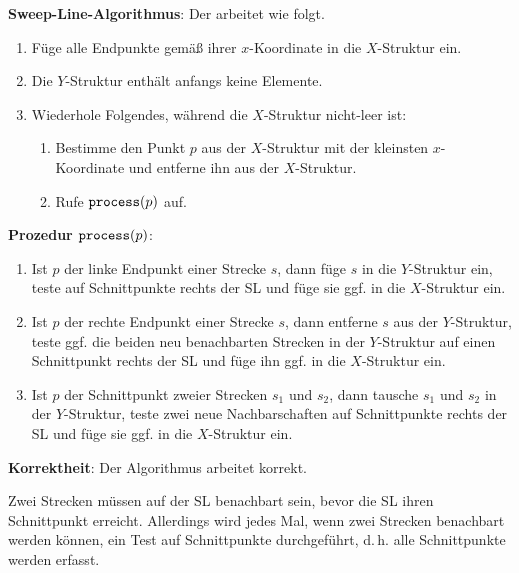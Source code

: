 \textbf{Sweep-Line-Algorithmus}:
Der  arbeitet wie folgt.
\begin{enumerate}
    \item
    Füge alle Endpunkte gemäß ihrer $x$-Koordinate in die $X$-Struktur ein.
    
    \item
    Die $Y$-Struktur enthält anfangs keine Elemente.
    
    \item
    Wiederhole Folgendes, während die $X$-Struktur nicht-leer ist:
    \begin{enumerate}
        \item
        Bestimme den Punkt $p$ aus der $X$-Struktur mit der kleinsten $x$-Koordinate und
        entferne ihn aus der $X$-Struktur.
        
        \item
        Rufe $\texttt{process}(p)$ auf.
    \end{enumerate}
\end{enumerate}

\linie
\pagebreak

\textbf{Prozedur $\texttt{process}(p)$}:
\begin{enumerate}
    \item
    Ist $p$ der linke Endpunkt einer Strecke $s$, dann füge $s$ in die $Y$-Struktur ein,
    teste auf Schnittpunkte rechts der SL und füge sie ggf. in die $X$-Struktur ein.
    
    \item
    Ist $p$ der rechte Endpunkt einer Strecke $s$, dann entferne $s$ aus der $Y$-Struktur,
    teste ggf.
    die beiden neu benachbarten Strecken in der $Y$-Struktur auf einen Schnittpunkt rechts der SL
    und füge ihn ggf. in die $X$-Struktur ein.
    
    \item
    Ist $p$ der Schnittpunkt zweier Strecken $s_1$ und $s_2$, dann tausche $s_1$ und $s_2$ in
    der $Y$-Struktur, teste zwei neue Nachbarschaften auf Schnittpunkte rechts der SL und
    füge sie ggf. in die $X$-Struktur ein.
\end{enumerate}

\linie

\textbf{Korrektheit}:
Der Algorithmus arbeitet korrekt.

\begin{Beweis}
    Zwei Strecken müssen auf der SL benachbart sein,
    bevor die SL ihren Schnittpunkt erreicht.
    Allerdings wird jedes Mal, wenn zwei Strecken benachbart werden können, ein Test auf
    Schnittpunkte durchgeführt, d.\,h. alle Schnittpunkte werden erfasst.
\end{Beweis}

